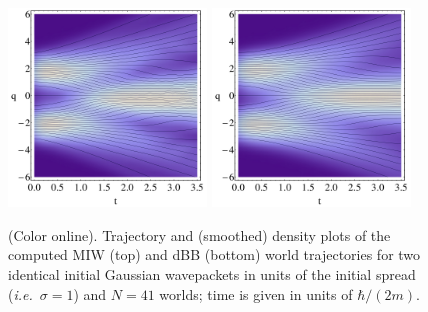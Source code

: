 \documentclass[twocolumn,aps,pra,amsmath,amssymb,superscriptaddress]{revtex4}
\newcommand{\ie}{{\em i.e.}}
\renewcommand{\(}{\left(}
\renewcommand{\)}{\right)}
\newcommand{\blk}{\color{black}}
\begin{document}
\begin{figure}[!t]
    \begin{center}
        \includegraphics[width=0.47\textwidth]{MIW_density_trajectories_black.jpg}
        \includegraphics[width=0.47\textwidth]{dBB_density_trajectories_black.jpg}
    \end{center}
    \caption{\label{dynamics} (Color online).
       Trajectory and (smoothed) density plots
        of the computed MIW (top) and dBB (bottom) world 
        trajectories 
    for two identical initial Gaussian wavepackets in units of the initial
spread (\ie~$\sigma=1$) and $N=41$ worlds; time is given in units of
$\hbar/(2m)$.\blk}
\end{figure}
\end{document}
